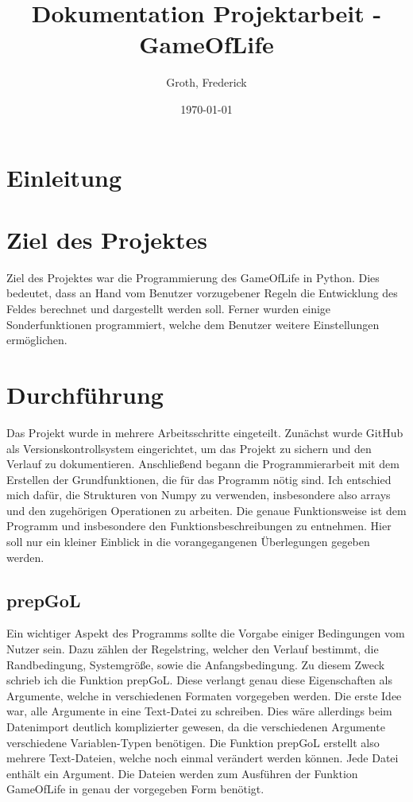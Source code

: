 \documentclass{scrartcl}
\begin{document}
\title{Dokumentation Projektarbeit - GameOfLife}
\author{Groth, Frederick}
\date{\today}
\maketitle
\newpage
\tableofcontents
\newpage
\section{Einleitung}
\section{Ziel des Projektes}
Ziel des Projektes war die Programmierung des GameOfLife in Python.
Dies bedeutet, dass an Hand vom Benutzer vorzugebener Regeln die Entwicklung des Feldes berechnet und dargestellt werden soll. Ferner wurden einige Sonderfunktionen programmiert, welche dem Benutzer weitere Einstellungen ermöglichen.
\section{Durchführung}
Das Projekt wurde in mehrere Arbeitsschritte eingeteilt. Zunächst wurde GitHub als Versionskontrollsystem eingerichtet, um das Projekt zu sichern und den Verlauf zu dokumentieren. Anschließend begann die Programmierarbeit mit dem Erstellen der Grundfunktionen, die für das Programm nötig sind. Ich entschied mich dafür, die Strukturen von Numpy zu verwenden, insbesondere also arrays und den zugehörigen Operationen zu arbeiten. Die genaue Funktionsweise ist dem Programm und insbesondere den Funktionsbeschreibungen zu entnehmen. Hier soll nur ein kleiner Einblick in die vorangegangenen Überlegungen gegeben werden.
\subsection{prepGoL}
Ein wichtiger Aspekt des Programms sollte die Vorgabe einiger Bedingungen vom Nutzer sein. Dazu zählen der Regelstring, welcher den Verlauf bestimmt, die Randbedingung, Systemgröße, sowie die Anfangsbedingung. Zu diesem Zweck schrieb ich die Funktion prepGoL. Diese verlangt genau diese Eigenschaften als Argumente, welche in verschiedenen Formaten vorgegeben werden. Die erste Idee war, alle Argumente in eine Text-Datei zu schreiben. Dies wäre allerdings beim Datenimport deutlich komplizierter gewesen, da die verschiedenen Argumente verschiedene Variablen-Typen benötigen. Die Funktion prepGoL erstellt also mehrere Text-Dateien, welche noch einmal verändert werden können. Jede Datei enthält ein Argument. Die Dateien werden zum Ausführen der Funktion GameOfLife in genau der vorgegeben Form benötigt.
\end{document}
